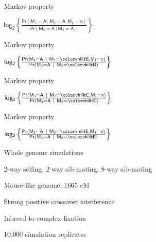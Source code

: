 \documentclass[aspectratio=169,12pt,t]{beamer}
\begin{document}
\begin{frame}[c]{Markov property}

\centerline{\hspace*{15mm} \hilit
$ \mathsf{log_2 \left\{ \frac{Pr(M_3 = A \ | \ M_2 = A, M_1 = x)}{Pr(M_3 = A \ | \ M_2 = A)} \right\} }$
}


\note{
}

\end{frame}

\begin{frame}[c]{Markov property}

\centerline{\hspace*{15mm} \hilit
$ \mathsf{log_2 \left\{ \frac{
    Pr(M_3 = A \ | \ M_2 = {\vhilit B}, M_1 = x)}{
    Pr(M_3 = A \ | \ M_2 = {\vhilit B})}\right\}}$
}


\note{
}

\end{frame}



\begin{frame}[c]{Markov property}

\centerline{\hspace*{15mm} \hilit
$ \mathsf{log_2 \left\{ \frac{
    Pr(M_3 = A \ | \ M_2 = {\vhilit C}, M_1 = x)}{
    Pr(M_3 = A \ | \ M_2 = {\vhilit C})}\right\}}$
}


\note{
}

\end{frame}


\begin{frame}[c]{Markov property}

\centerline{\hspace*{15mm} \hilit
$ \mathsf{log_2 \left\{ \frac{
    Pr(M_3 = A \ | \ M_2 = {\vhilit E}, M_1 = x)}{
    Pr(M_3 = A \ | \ M_2 = {\vhilit E})}\right\}}$
}


\note{
}

\end{frame}



\begin{frame}[c]{Whole genome simulations}

\bbi
\item 2-way selfing, 2-way sib-mating, 8-way sib-mating

\item Mouse-like genome, 1665 cM

\item Strong positive crossover interference

\item Inbreed to complex fixation

\item 10,000 simulation replicates
\ei


\note{
}

  \end{frame}
\end{document}
